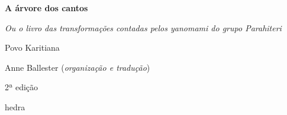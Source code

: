 




\begingroup\thispagestyle{empty}\vspace*{.05\textheight} 

              \formular
              \Huge
              \noindent
              \textbf{A árvore dos cantos}
              
              \vspace{0.3em}

              \noindent\large\textit{Ou o livro das transformações contadas pelos yanomami do grupo Parahiteri}

              \vspace{3em}
              
              \Large\noindent
              Povo Karitiana
              
              \vspace{3em}
              
              \newfontfamily{}
              {\selectfont\minion\small\noindent Anne Ballester (\textit{organização e tradução})}

              \bigskip

              \noindent
              {\selectfont\minion\small\noindent 2ª edição}

              \vfill

              \newfontfamily{}
              {\noindent\fontsize{30}{40}\selectfont \timesnewroman hedra}


\endgroup
\pagebreak
